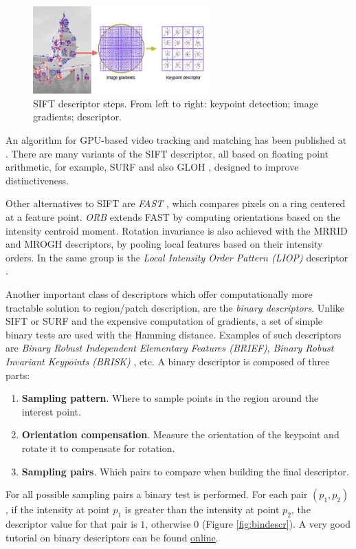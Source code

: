 \begin{figure}[H]
\begin{center}
\includegraphics[width=0.6\textwidth]{fig/SIFT}
\end{center}
\caption{SIFT descriptor steps. From left to right: keypoint detection; image gradients; descriptor.}
\label{fig:sift}
\end{figure}

An algorithm for GPU-based video tracking and matching has been published at \cite{Sinha06gpu-basedvideo}. There are many variants of the SIFT descriptor, all based on floating point arithmetic, for example, SURF\cite{Bay:2008:SURF} and also GLOH \cite{MS05}, designed to improve distinctiveness.  

Other alternatives to SIFT are {\em FAST} \cite{Rosten:2006}, which compares pixels on a ring centered at a feature point. {\em  ORB} \cite{Rublee:2011} extends FAST by computing orientations based on the intensity centroid moment. Rotation invariance is also achieved with the MRRID and MROGH descriptors, \cite{journals:pami:FanWH12} by pooling local features based on their intensity orders. In the same group is the {\em Local Intensity Order Pattern (LIOP)} descriptor \cite{ZhenhuaWang:2011:LIO}. 

Another important class of descriptors which offer computationally more tractable solution to region/patch description, are the {\em binary descriptors}. Unlike SIFT or SURF and the expensive computation of gradients, a set of simple binary tests are used with the Hamming distance. Examples of such descriptors are {\em Binary Robust Independent Elementary Features (BRIEF)}\cite{Calonder:2010}, {\em Binary Robust Invariant Keypoints (BRISK)} \cite{Leutenegger:2011}, etc. A binary descriptor is composed of three parts:
\begin{enumerate}
\item{\bf Sampling pattern}. Where to sample points in the region around the interest point.
\item{\bf Orientation compensation}. Measure the orientation of the keypoint and rotate it to compensate for rotation.
\item{\bf Sampling pairs}. Which pairs to compare when building the final descriptor.
\end{enumerate}
For all possible sampling pairs a binary test is performed. For each pair $(p_1, p_2)$, if the intensity at point $p_1$ is greater than the intensity at point $p_2$, the descriptor value for that pair is $1$, otherwise $0$ (Figure \ref{fig:bindescr}). A very good tutorial on binary descriptors can be found \href{https://gilscvblog.wordpress.com/?s=descriptors}{\underline{online}}. 

